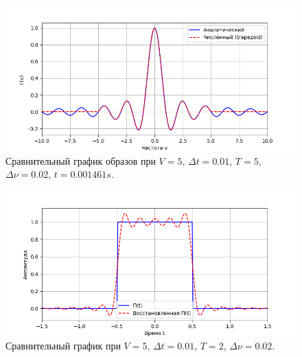 \documentclass[a4paper]{article}
\begin{document}
\begin{figure}[H]
  \centering
  \includegraphics[width=\textwidth]{src/task_1_1/freq_5_0.01_5_0.02.png}
  \caption{Сравнительный график образов при $V=5$, $\Delta t=0.01$, $T=5$, $\Delta \nu=0.02$, $t=0.001461 s$.} 
\end{figure}
\begin{figure}[H]
  \centering
  \includegraphics[width=\textwidth]{src/task_1_1/time_5_0.01_5_0.02.png}
  \caption{Сравнительный график при $V=5$, $\Delta t=0.01$, $T=2$, $\Delta \nu=0.02$.} 
\end{figure}
\end{document}
